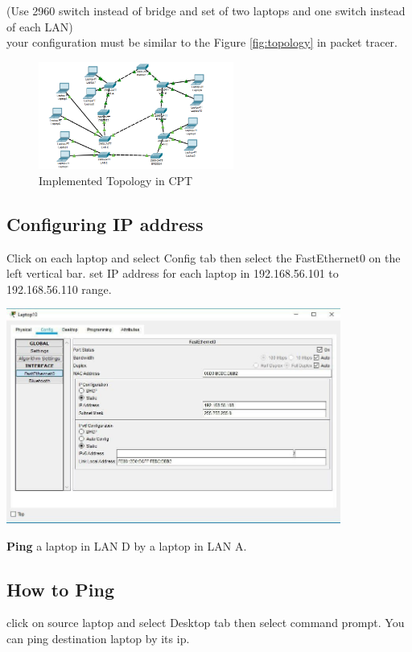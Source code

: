 \documentclass[10pt,a4paper]{article}
\numberwithin{equation}{section}
\numberwithin{figure}{section}
\numberwithin{table}{section}
\begin{document}
(Use 2960 switch instead of bridge and set of two laptops and one switch instead of each LAN)\\
your configuration must be similar to the Figure \ref{fig:topology} in packet tracer.

\begin{figure}[H]
	\centering
    \includegraphics[height=100pt]{img/fig2.png}
    \caption{Implemented Topology in CPT}
\end{figure}

\subsection{Configuring IP address}
	Click  on each laptop and select Config tab then select the FastEthernet0 on the left vertical bar. set IP address for each laptop in 192.168.56.101 to 192.168.56.110 range. \\

	\begin{center}
        \includegraphics[height=200pt]{img/fig3.png}
    \end{center}
    
    \textbf{Ping} a laptop in LAN D by a laptop in LAN A.

\subsection*{How to Ping}

click on source laptop and select Desktop tab then select command prompt. You can ping destination laptop by its ip. 
\end{document}
